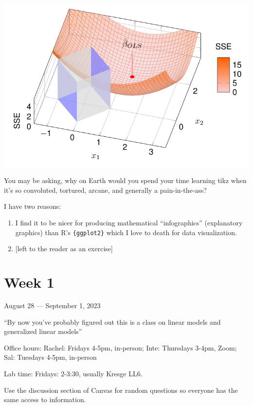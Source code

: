 \documentclass[
  letterpaper,
  DIV=11,
  numbers=noendperiod]{scrreport}
\providecommand{\tightlist}{%
  \setlength{\itemsep}{0pt}\setlength{\parskip}{0pt}}\usepackage{longtable,booktabs,array}
\begin{document}
\includegraphics[width=1\textwidth,height=\textheight]{./week6/standalone_figures/3d_lasso/3d_lasso.svg}

You may be asking, why on Earth would you spend your time learning tikz
when it's so convoluted, tortured, arcane, and generally a
pain-in-the-ass?

I have two reasons:

\begin{enumerate}
\def\labelenumi{\arabic{enumi}.}
\tightlist
\item
  I find it to be nicer for producing mathematical ``infographics''
  (explanatory graphics) than R's \texttt{\{ggplot2\}} which I love to
  death for data visualization.
\item
  {[}left to the reader as an exercise{]}
\end{enumerate}


\hypertarget{week-1}{%
\chapter{Week 1}\label{week-1}}

August 28 --- September 1, 2023

``By now you've probably figured out this is a class on linear models
and generalized linear models''

Office hours: Rachel: Fridays 4-5pm, in-person; Inte: Thursdays 3-4pm,
Zoom; Sal: Tuesdays 4-5pm, in-person

Lab time: Fridays: 2-3:30, usually Kresge LL6.

Use the discussion section of Canvas for random questions so everyone
has the same access to information.
\end{document}
